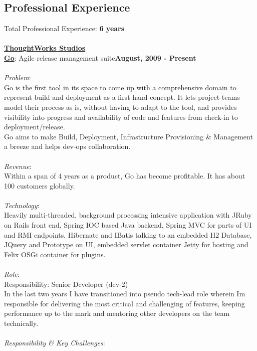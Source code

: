 \documentclass[margin,line]{res}
\begin{document}
\begin{resume}
\section{\sc Professional Experience}
Total Professional Experience: {\bf 6 years}\\
\\
{\underline {\bf ThoughtWorks Studios}}\\
\vspace{-.1cm}
\href{http://www.thoughtworks-studios.com/go-agile-release-management}{\bf Go}: Agile release management suite\hfill {\bf August, 2009 - Present}\\
\vspace{-.2cm}\\
{\em Problem}:\\
Go is the first tool in its space to come up with a comprehensive domain to represent build and deployment as a first hand concept. It lets project teams model their process as is, without having to adapt to the tool, and provides visibility into progress and availability of code and features from check-in to deployment/release.\\
Go aims to make Build, Deployment, Infrastructure Provisioning \& Management a breeze and helps dev-ops collaboration.\\
\\
{\em Revenue}:\\
Within a span of 4 years as a product, Go has become profitable. It has about 100 customers globally.\\
\\
{\em Technology}:\\
Heavily multi-threaded, background processing intensive application with JRuby on Rails front end, Spring IOC based Java backend, Spring MVC for parts of UI and RMI endpoints, Hibernate and IBatis talking to an embedded H2 Database, JQuery and Prototype on UI, embedded servlet container Jetty for hosting and Felix OSGi container for plugins.\\
\\
{\em Role}: \\
Responsibility: Senior Developer (dev-2)\\
In the last two years I have transitioned into pseudo tech-lead role wherein Im responsible for delivering the most critical and challenging of features, keeping performance up to the mark and mentoring other developers on the team technically.\\
\\
{\em Responsibility \& Key Challenges}:

\end{resume}
\end{document}

